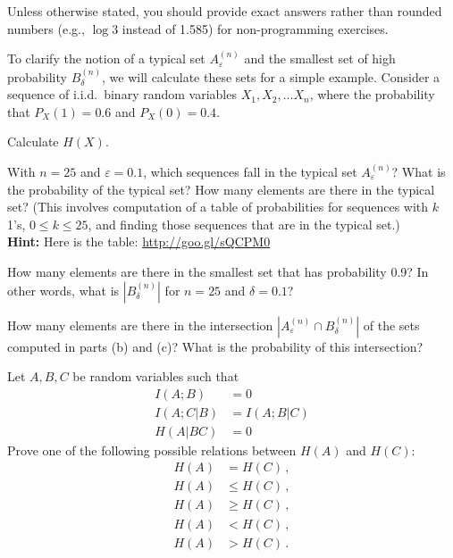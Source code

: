 \documentclass[a4paper,10pt,landscape,twocolumn]{scrartcl}
\begin{document}
\homeworkproblems

{\sffamily\noindent
Unless otherwise stated, you should provide exact answers rather than rounded numbers (e.g., $\log 3$ instead of 1.585) for non-programming exercises.
}

\newcommand{\typsetA}{A^{(n)}_{\varepsilon}}
\newcommand{\typsetB}{B^{(n)}_{\delta}}

\begin{exercise}
To clarify the notion of a typical set $\typsetA$ and the smallest set of high probability $\typsetB$, we will calculate these sets for a simple example. Consider a sequence of i.i.d.\ binary random variables $X_1, X_2, . . . X_n$, where the probability that $P_X(1) = 0.6$ and $P_X(0) = 0.4$.
	\begin{subex}[(1pt)]
	Calculate $H(X)$.
	\end{subex}
	\begin{subex}[(3pt)]
	With $n = 25$ and $\varepsilon = 0.1$, which sequences fall in the typical set $\typsetA$? What is the probability of the typical set? How many elements are there in the typical set? (This involves computation of a table of probabilities for sequences with $k$ 1's, $0 \leq k \leq 25$, and finding those sequences that are in the typical set.)
\\\textbf{Hint:} Here is the table: \url{http://goo.gl/sQCPM0}
	\end{subex}
	\begin{subex}[(2pt)]
	How many elements are there in the smallest set that has probability 0.9? In other words, what is $|\typsetB|$ for $n = 25$ and $\delta = 0.1$?
	\end{subex}
	\begin{subex}[(2pt)]
	How many elements are there in the intersection $|\typsetA \cap \typsetB|$ of the sets computed in parts (b) and (c)? What is the probability of this intersection?
	\end{subex}
\end{exercise}

\begin{exercise}
Let $A,B,C$ be random variables such that
\begin{align*}
I(A;B) &= 0\\
I(A;C|B) &= I(A;B|C)\\
H(A|BC) &= 0
\end{align*}
Prove one of the following possible relations between $H(A)$ and $H(C)$:
\begin{align*}
H(A)&=H(C) \, ,\\
H(A) &\leq H(C) \, ,\\
H(A) &\geq H(C) \, ,\\
H(A) &< H(C) \, ,\\
H(A) &> H(C) \, .
\end{align*}
\end{exercise}
\end{document}
